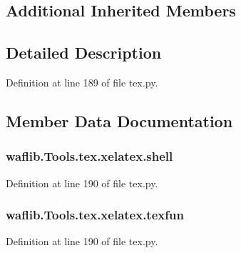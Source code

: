 \subsection*{Additional Inherited Members}


\subsection{Detailed Description}


Definition at line 189 of file tex.\+py.



\subsection{Member Data Documentation}
\subsubsection[{\texorpdfstring{shell}{shell}}]{\setlength{\rightskip}{0pt plus 5cm}waflib.\+Tools.\+tex.\+xelatex.\+shell\hspace{0.3cm}{\ttfamily [static]}}\hypertarget{classwaflib_1_1_tools_1_1tex_1_1xelatex_a7107a73e104d27a8e57587fa96b4f5d2}{}\label{classwaflib_1_1_tools_1_1tex_1_1xelatex_a7107a73e104d27a8e57587fa96b4f5d2}


Definition at line 190 of file tex.\+py.

\subsubsection[{\texorpdfstring{texfun}{texfun}}]{\setlength{\rightskip}{0pt plus 5cm}waflib.\+Tools.\+tex.\+xelatex.\+texfun\hspace{0.3cm}{\ttfamily [static]}}\hypertarget{classwaflib_1_1_tools_1_1tex_1_1xelatex_adea6951f02e1b389b310035bfae0b316}{}\label{classwaflib_1_1_tools_1_1tex_1_1xelatex_adea6951f02e1b389b310035bfae0b316}


Definition at line 190 of file tex.\+py.

